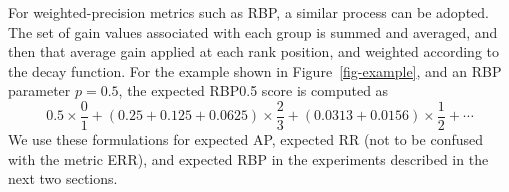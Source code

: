 For weighted-precision metrics such as RBP, a similar process can be
adopted.
The set of gain values associated with each group is summed and
averaged, and then that average gain applied at each rank position,
and weighted according to the decay function.
For the example shown in Figure~\ref{fig-example}, and an RBP
parameter $p=0.5$, the expected RBP0.5 score is computed as
\newcommand{\mysub}[2]{{#1}_{\mbox{\scriptsize{\,#2}}}}
\[
	0.5\times
		\frac{0}{1}
	+
	(0.25+0.125+0.0625)\times
		\frac{2}{3}
	+
	(0.0313+0.0156)\times
		\frac{1}{2}
	+
	\cdots
\]
We use these formulations for expected AP, expected RR (not to be
confused with the metric ERR), and expected RBP in the experiments
described in the next two sections.
